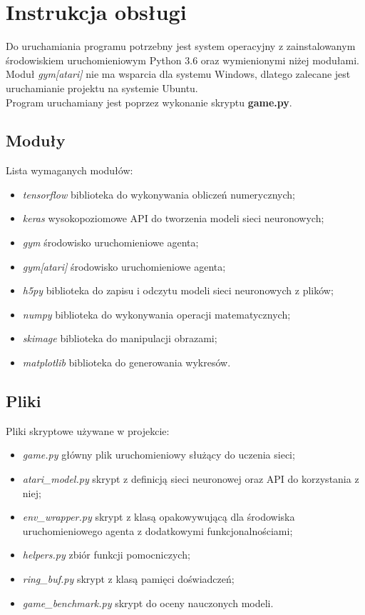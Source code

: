 \documentclass[12pt]{article}
\begin{document}
\section{Instrukcja obsługi}

Do uruchamiania programu potrzebny jest system operacyjny z zainstalowanym środowiskiem uruchomieniowym Python 3.6 oraz wymienionymi niżej modułami. Moduł \textit{gym[atari]} nie ma wsparcia dla systemu Windows, dlatego zalecane jest uruchamianie projektu na systemie Ubuntu. 
\\

Program uruchamiany jest poprzez wykonanie skryptu \textbf{game.py}.

\subsection{Moduły}
Lista wymaganych modułów:
\begin{itemize}
\item \textit{tensorflow} biblioteka do wykonywania obliczeń numerycznych;
\item \textit{keras} wysokopoziomowe API do tworzenia modeli sieci neuronowych;
\item \textit{gym} środowisko uruchomieniowe agenta;
\item \textit{gym[atari]} środowisko uruchomieniowe agenta;
\item \textit{h5py} biblioteka do zapisu i odczytu modeli sieci neuronowych z plików;
\item \textit{numpy} biblioteka do wykonywania operacji matematycznych;
\item \textit{skimage} biblioteka do manipulacji obrazami;
\item \textit{matplotlib} biblioteka do generowania wykresów.
\end{itemize}

\subsection{Pliki}
Pliki skryptowe używane w projekcie:
\begin{itemize}
\item \textit{game.py} główny plik uruchomieniowy służący do uczenia sieci;
\item \textit{atari\_model.py} skrypt z definicją sieci neuronowej oraz API do korzystania z niej;
\item \textit{env\_wrapper.py} skrypt z klasą opakowywującą dla środowiska uruchomieniowego agenta z dodatkowymi funkcjonalnościami;
\item \textit{helpers.py} zbiór funkcji pomocniczych;
\item \textit{ring\_buf.py} skrypt z klasą pamięci doświadczeń;
\item \textit{game\_benchmark.py} skrypt do oceny nauczonych modeli.
\end{itemize}
\end{document}
